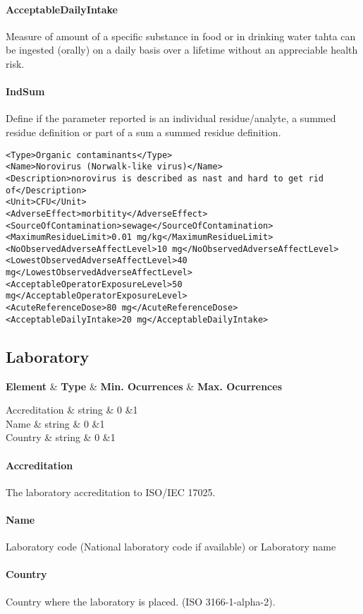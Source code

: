 \documentclass[a4paper]{report}
\def\starttable{%
    \tabular{|l|c|c|c|}
    \hline
    \textbf{Element} & \textbf{Type} & \textbf{Min. Ocurrences} & \textbf{Max. Ocurrences} \\    
    \hline
}
\def\stoptable{%
    \hline \endtabular
}
\def\R #1|#2|#3|#4{ #1&#2&#3&#4 \\}
\begin{document}
\paragraph{AcceptableDailyIntake}
Measure of amount of a specific substance in food or in drinking water tahta can be ingested (orally) on a daily basis over a lifetime without an appreciable health risk.

\paragraph{IndSum}
Define if the parameter reported is an individual residue/analyte, a summed residue definition or part of a sum a summed residue definition.

\begin{lstlisting}[language=RAKIP, caption={Example of Hazard}]
<Type>Organic contaminants</Type>
<Name>Norovirus (Norwalk-like virus)</Name>
<Description>norovirus is described as nast and hard to get rid
of</Description>
<Unit>CFU</Unit>
<AdverseEffect>morbitity</AdverseEffect>
<SourceOfContamination>sewage</SourceOfContamination>
<MaximumResidueLimit>0.01 mg/kg</MaximumResidueLimit>
<NoObservedAdverseAffectLevel>10 mg</NoObservedAdverseAffectLevel>
<LowestObservedAdverseAffectLevel>40 mg</LowestObservedAdverseAffectLevel>
<AcceptableOperatorExposureLevel>50 mg</AcceptableOperatorExposureLevel>
<AcuteReferenceDose>80 mg</AcuteReferenceDose>
<AcceptableDailyIntake>20 mg</AcceptableDailyIntake>
\end{lstlisting}

\subsection{Laboratory}
\label{class:Laboratory}

\starttable
    \R Accreditation | string | 0 | 1
    \R Name | string | 0 | 1
    \R Country | string | 0 | 1
\stoptable

\paragraph{Accreditation}
The laboratory accreditation to ISO/IEC 17025.

\paragraph{Name}
Laboratory code (National laboratory code if available) or Laboratory name 

\paragraph{Country}
Country where the laboratory is placed. (ISO 3166-1-alpha-2).
\end{document}
